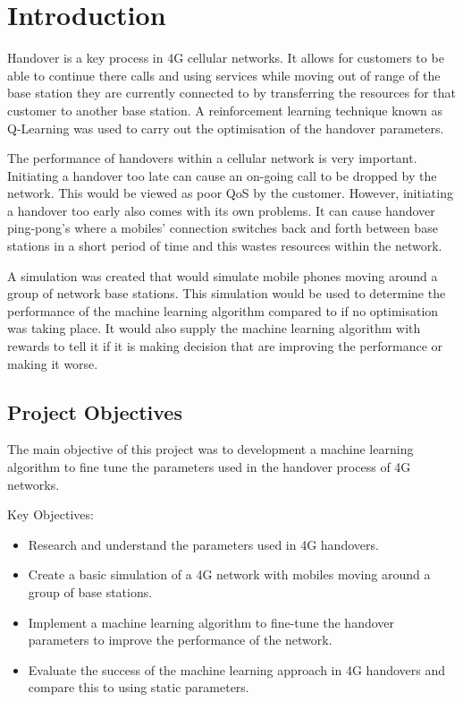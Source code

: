 \chapter{Introduction}
Handover is a key process in \ac{4G} cellular networks. It allows for customers to be able to continue there calls and using services while moving out of range of the base station they are currently connected to by transferring the resources for that customer to another base station. A reinforcement learning technique known as Q-Learning was used to carry out the optimisation of the handover parameters.

The performance of handovers within a cellular network is very important. Initiating a handover too late can cause an on-going call to be dropped by the network. This would be viewed as poor \ac{QoS} by the customer.  However, initiating a handover too early also comes with its own problems. It can cause handover ping-pong's where a mobiles' connection switches back and forth between base stations in a short period of time and this wastes resources within the network.  

A simulation was created that would simulate mobile phones moving around a group of network base stations. This simulation would be used to determine the performance of the machine learning algorithm compared to if no optimisation was taking place. It would also supply the machine learning algorithm with rewards to tell it if it is making decision that are improving the performance or making it worse.
\section{Project Objectives}
The main objective of this project was to development a machine learning algorithm to fine tune the parameters used in the handover process of 4G networks.

Key Objectives:
\begin{itemize}
	\item Research and understand the parameters used in 4G handovers.
	\item Create a basic simulation of a 4G network with mobiles moving around a group of base stations.
	\item Implement a machine learning algorithm to fine-tune the handover parameters to improve the performance of the network.
	\item Evaluate the success of the machine learning approach in 4G handovers and compare this to using static parameters.
\end{itemize}
